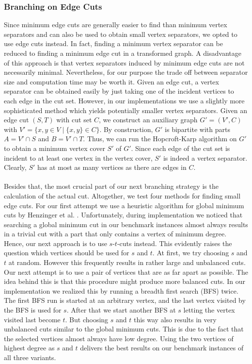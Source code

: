 \documentclass[12pt,a4paper,twoside]{scrartcl}
\numberwithin{equation}{section}
\begin{document}
\subsubsection{Branching on Edge Cuts}
Since minimum edge cuts are generally easier to find than minimum vertex separators and can also be used to obtain small vertex separators, we opted to use edge cuts instead. In fact, finding a minimum vertex separator can be reduced to finding a minimum edge cut in a transformed graph. A disadvantage of this approach is that vertex separators induced by minimum edge cuts are not necessarily minimal. Nevertheless, for our purpose the trade off between separator size and computation time may be worth it. Given an edge cut, a vertex separator can be obtained easily by just taking one of the incident vertices to each edge in the cut set. However, in our implementations we use a slightly more sophisticated method which yields potentially smaller vertex separators. Given an edge cut $(S,T)$ with cut set $C$, we construct an auxiliary graph $G'=(V',C)$  with $V' = \{x,y\in V\;|\;\{x,y\}\in C\}$. By construction, $G'$ is bipartite with parts $A = V'\cap S$ and $B = V'\cap T$. Thus, we can run the Hopcroft-Karp algorithm on $G'$ to obtain a minimum vertex cover $S'$ of $G'$. Since each edge of the cut set is incident to at least one vertex in the vertex cover, $S'$ is indeed a vertex separator. Clearly, $S'$ has at most as many vertices as there are edges in $C$.
\paragraph{}
Besides that, the most crucial part of our next branching strategy is the calculation of the actual cut. Altogether, we test four methods for finding small edge cuts. For our first attempt we use a heuristic algorithm for global minimum cuts by Henzinger et al. \cite{Henzinger}. Unfortunately, during implementation we noticed that searching a global minimum cut in our benchmark instances almost always results in a trivial cut with a part that only contains a vertex of minimum degree. Hence, our next approach is  to use $s$-$t$-cuts instead. This evidently raises the question which vertices should be used for $s$ and $t$. At first, we try choosing $s$ and $t$ at random. However this frequently results in rather large and unbalanced cuts. Our next attempt is to use a pair of vertices that are as far apart as possible. The idea behind this is that this procedure might produce more balanced cuts. In our implementation we realized this by running a breadth first search (BFS) twice. The first BFS run is started at an arbitrary vertex, and the last vertex visited by the BFS is used for $s$. After that we start another BFS at $s$ letting the vertex visited last become $t$. But choosing $s$ and $t$ this way also results in very unbalanced cuts similar to the global minimum cuts. This is due to the fact that the selected vertices almost always have low degree. Using the two vertices of highest degree as $s$ and $t$ delivers the best results on our benchmark instances of all three variants.
\end{document}
